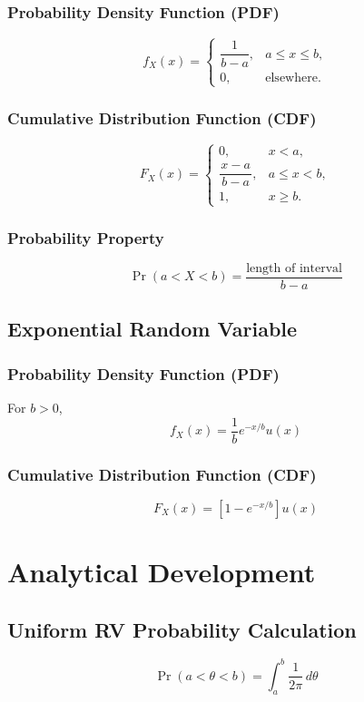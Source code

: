 \documentclass[12pt]{article}
\begin{document}
\subsubsection{Probability Density Function (PDF)}
\[
f_X(x)=
\begin{cases}
\dfrac{1}{b-a}, & a \le x \le b, \\
0, & \text{elsewhere}.
\end{cases}
\]

\subsubsection{Cumulative Distribution Function (CDF)}
\[
F_X(x)=
\begin{cases}
0, & x < a, \\
\dfrac{x-a}{\,b-a\,}, & a \le x < b, \\
1, & x \ge b.
\end{cases}
\]

\subsubsection{Probability Property}
\[
\Pr(a<X<b)=\dfrac{\text{length of interval}}{b-a}
\]

\subsection{Exponential Random Variable}

\subsubsection{Probability Density Function (PDF)}
For $b>0$,
\[
f_X(x)=\frac{1}{b}e^{-x/b}u(x)
\]

\subsubsection{Cumulative Distribution Function (CDF)}
\[
F_X(x)=\left[1-e^{-x/b}\right]u(x)
\]

\newpage

\section{Analytical Development}

\subsection{Uniform RV Probability Calculation}
\[
\Pr(a<\theta<b)=\int_a^b \frac{1}{2\pi}\, d\theta
\]
\end{document}
